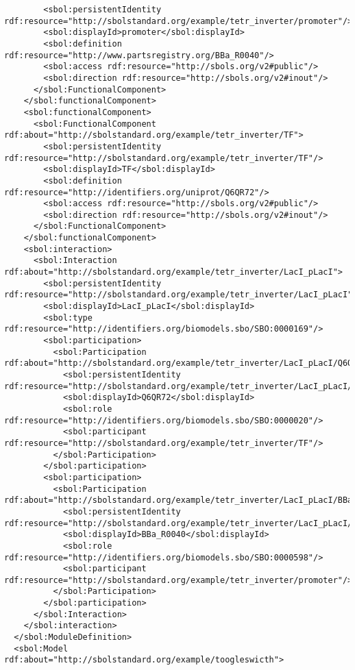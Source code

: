 \begin{lstlisting}
        <sbol:persistentIdentity rdf:resource="http://sbolstandard.org/example/tetr_inverter/promoter"/>
        <sbol:displayId>promoter</sbol:displayId>
        <sbol:definition rdf:resource="http://www.partsregistry.org/BBa_R0040"/>
        <sbol:access rdf:resource="http://sbols.org/v2#public"/>
        <sbol:direction rdf:resource="http://sbols.org/v2#inout"/>
      </sbol:FunctionalComponent>
    </sbol:functionalComponent>
    <sbol:functionalComponent>
      <sbol:FunctionalComponent rdf:about="http://sbolstandard.org/example/tetr_inverter/TF">
        <sbol:persistentIdentity rdf:resource="http://sbolstandard.org/example/tetr_inverter/TF"/>
        <sbol:displayId>TF</sbol:displayId>
        <sbol:definition rdf:resource="http://identifiers.org/uniprot/Q6QR72"/>
        <sbol:access rdf:resource="http://sbols.org/v2#public"/>
        <sbol:direction rdf:resource="http://sbols.org/v2#inout"/>
      </sbol:FunctionalComponent>
    </sbol:functionalComponent>
    <sbol:interaction>
      <sbol:Interaction rdf:about="http://sbolstandard.org/example/tetr_inverter/LacI_pLacI">
        <sbol:persistentIdentity rdf:resource="http://sbolstandard.org/example/tetr_inverter/LacI_pLacI"/>
        <sbol:displayId>LacI_pLacI</sbol:displayId>
        <sbol:type rdf:resource="http://identifiers.org/biomodels.sbo/SBO:0000169"/>
        <sbol:participation>
          <sbol:Participation rdf:about="http://sbolstandard.org/example/tetr_inverter/LacI_pLacI/Q6QR72">
            <sbol:persistentIdentity rdf:resource="http://sbolstandard.org/example/tetr_inverter/LacI_pLacI/Q6QR72"/>
            <sbol:displayId>Q6QR72</sbol:displayId>
            <sbol:role rdf:resource="http://identifiers.org/biomodels.sbo/SBO:0000020"/>
            <sbol:participant rdf:resource="http://sbolstandard.org/example/tetr_inverter/TF"/>
          </sbol:Participation>
        </sbol:participation>
        <sbol:participation>
          <sbol:Participation rdf:about="http://sbolstandard.org/example/tetr_inverter/LacI_pLacI/BBa_R0040">
            <sbol:persistentIdentity rdf:resource="http://sbolstandard.org/example/tetr_inverter/LacI_pLacI/BBa_R0040"/>
            <sbol:displayId>BBa_R0040</sbol:displayId>
            <sbol:role rdf:resource="http://identifiers.org/biomodels.sbo/SBO:0000598"/>
            <sbol:participant rdf:resource="http://sbolstandard.org/example/tetr_inverter/promoter"/>
          </sbol:Participation>
        </sbol:participation>
      </sbol:Interaction>
    </sbol:interaction>
  </sbol:ModuleDefinition>
  <sbol:Model rdf:about="http://sbolstandard.org/example/toogleswicth">

\end{lstlisting}
